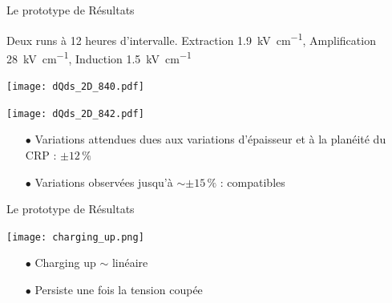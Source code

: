     \begin{frame}{Le prototype de \TOO{}}{Résultats}
        \begin{scriptsize}
            \centering Deux runs à 12 heures d'intervalle. Extraction \SI{1.9}{\kilo\volt\per\centi\meter}, Amplification \SI{28}{\kilo\volt\per\centi\meter}, Induction \SI{1.5}{\kilo\volt\per\centi\meter}\\\vspace{0.2cm}
            \begin{center} \vspace{-0.5cm}\texttt{[image: dQds\_2D\_840.pdf]} \end{center}
            \begin{center} \vspace{-0.5cm}\texttt{[image: dQds\_2D\_842.pdf]} \end{center}
            \vspace{-0.5cm}
            \begin{itemize}
    			\item[$\bullet$] Variations attendues dues aux variations d'épaisseur et à la planéité du CRP : $\pm 12 \,\%$
    			\item[$\bullet$] Variations observées jusqu'à $\sim \pm15\,\%$ : compatibles
			\end{itemize}
        \end{scriptsize}
    \end{frame}

   \begin{frame}{Le prototype de \TOO{}}{Résultats}
        \begin{scriptsize}
            \texttt{[image: charging\_up.png]}
            \begin{itemize}
                \item[$\bullet$] Charging up $\sim$ linéaire
                \item[$\bullet$] Persiste une fois la tension coupée
            \end{itemize}
        \end{scriptsize}
    \end{frame}

